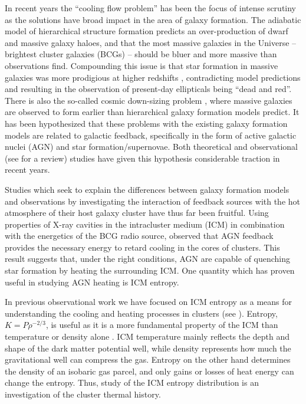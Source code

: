 \documentclass{emulateapj}
\begin{document}
In recent years the ``cooling flow problem'' has been the focus of
intense scrutiny as the solutions have broad impact in the area of
galaxy formation. The adiabatic model of hierarchical structure
formation predicts an over-production of dwarf and massive galaxy
haloes, and that the most massive galaxies in the Universe --
brightest cluster galaxies (BCGs) -- should be bluer and more massive
than observations find. Compounding this issue is that star formation
in massive galaxies was more prodigious at higher redshifts
\citep{1996AJ....112..839C, 2005ApJ...619L.135J}, contradicting model
predictions and resulting in the observation of present-day
ellipticals being ``dead and red''. There is also the so-called cosmic
down-sizing problem \citep{1996AJ....112..839C}, where massive
galaxies are observed to form earlier than hierarchical galaxy
formation models predict. It has been hypothesized that these problems
with the existing galaxy formation models are related to galactic
feedback, specifically in the form of active galactic nuclei (AGN) and
star formation/supernovae. Both theoretical \citep{bower06, croton06}
and observational (see \citealt{mcnamrev} for a review) studies have
given this hypothesis considerable traction in recent years.

Studies which seek to explain the differences between galaxy formation
models and observations by investigating the interaction of feedback
sources with the hot atmosphere of their host galaxy cluster have thus
far been fruitful. Using properties of X-ray cavities in the
intracluster medium (ICM) in combination with the energetics of the
BCG radio source, \cite{birzan04} observed that AGN feedback provides
the necessary energy to retard cooling in the cores of clusters. This
result suggests that, under the right conditions, AGN are capable of
quenching star formation by heating the surrounding ICM. One quantity
which has proven useful in studying AGN heating is ICM entropy.

In previous observational work we have focused on ICM entropy as a
means for understanding the cooling and heating processes in clusters
(see \citealt{radioquiet, d06, accept}). Entropy, $K=P\rho^{-2/3}$, is
useful as it is a more fundamental property of the ICM than
temperature or density alone \citep{voitbryan,voitreview}. ICM
temperature mainly reflects the depth and shape of the dark matter
potential well, while density represents how much the gravitational
well can compress the gas. Entropy on the other hand determines the
density of an isobaric gas parcel, and only gains or losses of heat
energy can change the entropy. Thus, study of the ICM entropy
distribution is an investigation of the cluster thermal history.
\end{document}
